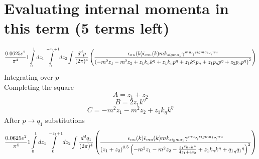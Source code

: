 \section*{Evaluating internal momenta in this term (5 terms left)}
\begin{dmath}\frac{0.0625 e^{2}}{\pi^{4}}1\int\limits_{ 0 }^{ 1 } d{ z_{ 1 } }\int\limits_{ 0 }^{ - { z_{ 1 } } + 1 } d{ z_{ 2 } }\int\frac{d^d p }{ (2\pi)^4 }\left(\frac{\epsilon_{ \\nu }({ k }) \bar{\epsilon}_{ \\mu }({ k }) m { { k }_{ \\sigma_1 } } { \gamma^{ \\mu } } { \gamma^{ \\sigma_1 } } { \gamma^{ \\nu } }}{\left(- m^{2} { z_{ 1 } } - m^{2} { z_{ 2 } } + { z_{ 1 } } { { k }_{ \eta } } { { k }^{ \eta } } + { z_{ 1 } } { { k }_{ \eta } } { { p }^{ \eta } } + { z_{ 1 } } { { k }^{ \eta } } { { p }_{ \eta } } + { z_{ 1 } } { { p }_{ \eta } } { { p }^{ \eta } } + { z_{ 2 } } { { p }_{ \eta } } { { p }^{ \eta } }\right)^{2}}\right)\end{dmath}
Integrating over $p$\\
Completing the square\
\begin{dmath}A = { z_{ 1 } } + { z_{ 2 } }\end{dmath}
\begin{dmath}B = 2 { z_{ 1 } } { { k }^{ \eta } }\end{dmath}
\begin{dmath}C = - m^{2} { z_{ 1 } } - m^{2} { z_{ 2 } } + { z_{ 1 } } { { k }_{ \eta } } { { k }^{ \eta } }\end{dmath}
After $p \to q_1$ substitutions
\begin{dmath}\frac{0.0625 e^{2}}{\pi^{4}}1\int\limits_{ 0 }^{ 1 } d{ z_{ 1 } }\int\limits_{ 0 }^{ - { z_{ 1 } } + 1 } d{ z_{ 2 } }\int\frac{d^d q_1 }{ (2\pi)^4 }\left(\frac{\epsilon_{ \\nu }({ k }) \bar{\epsilon}_{ \\mu }({ k }) m { { k }_{ \\sigma_1 } } { \gamma^{ \\mu } } { \gamma^{ \\sigma_1 } } { \gamma^{ \\nu } }}{\left({ z_{ 1 } } + { z_{ 2 } }\right)^{0.5} \left(- m^{2} { z_{ 1 } } - m^{2} { z_{ 2 } } - \frac{{ z_{ 1 } }^{2} { { k }_{ \eta } } { { k }^{ \eta } }}{4 { z_{ 1 } } + 4 { z_{ 2 } }} + { z_{ 1 } } { { k }_{ \eta } } { { k }^{ \eta } } + { { q_1 }_{ \eta } } { { q_1 }^{ \eta } }\right)^{2}}\right)\end{dmath}
